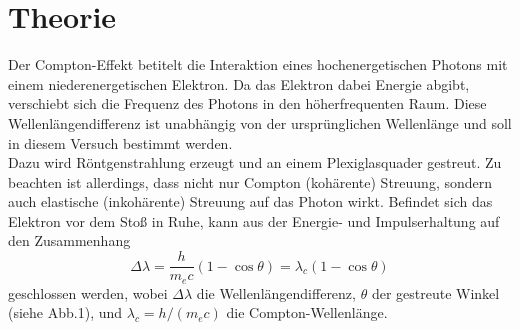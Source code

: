 \section{Theorie}
\label{sec:Theorie}
    Der Compton-Effekt betitelt die Interaktion eines hochenergetischen Photons mit einem 
    niederenergetischen Elektron. Da das Elektron dabei Energie abgibt, verschiebt sich 
    die Frequenz des Photons in den höherfrequenten Raum. Diese Wellenlängendifferenz
    ist unabhängig von der ursprünglichen Wellenlänge und soll in diesem Versuch bestimmt 
    werden.\\
    Dazu wird Röntgenstrahlung erzeugt und an einem Plexiglasquader gestreut. Zu beachten 
    ist allerdings, dass nicht nur Compton (kohärente) Streuung, sondern auch
    elastische (inkohärente) Streuung auf das Photon wirkt. Befindet sich das Elektron 
    vor dem Stoß in Ruhe, kann aus der Energie- und Impulserhaltung auf den Zusammenhang
    \begin{equation*}
        \Delta \lambda = \dfrac{h}{m_e c}(1-\cos{\theta})=\lambda_c(1-\cos{\theta})
    \end{equation*}
    geschlossen werden, wobei $\Delta \lambda$ die Wellenlängendifferenz, $\theta$ der 
    gestreute Winkel (siehe Abb.1), und $\lambda_c=h/(m_e c)$ die Compton-Wellenlänge.
    

